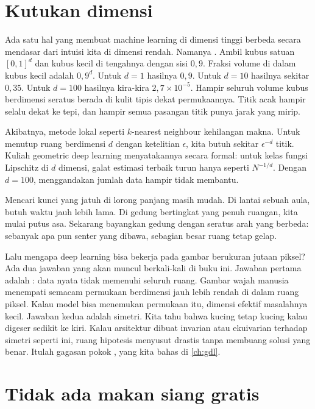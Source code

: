 \section{Kutukan dimensi}

Ada satu hal yang membuat machine learning di dimensi tinggi berbeda secara mendasar dari
intuisi kita di dimensi rendah. Namanya . Ambil kubus satuan
$[0,1]^d$ dan kubus kecil di tengahnya dengan sisi $0{,}9$. Fraksi volume di dalam kubus kecil
adalah $0{,}9^d$. Untuk $d=1$ hasilnya $0{,}9$. Untuk $d=10$ hasilnya sekitar $0{,}35$. Untuk
$d=100$ hasilnya kira-kira $2{,}7\times10^{-5}$. Hampir seluruh volume kubus berdimensi seratus
berada di kulit tipis dekat permukaannya. Titik acak hampir selalu dekat ke tepi, dan hampir
semua pasangan titik punya jarak yang mirip.

Akibatnya, metode lokal seperti $k$-nearest neighbour kehilangan makna. Untuk menutup ruang
berdimensi $d$ dengan ketelitian $\epsilon$, kita butuh sekitar $\epsilon^{-d}$ titik. Kuliah
geometric deep learning menyatakannya secara formal: untuk kelas fungsi Lipschitz di $d$ dimensi,
galat estimasi terbaik turun hanya seperti $N^{-1/d}$. Dengan $d=100$, menggandakan jumlah data
hampir tidak membantu.

Mencari kunci yang jatuh di lorong panjang masih mudah. Di lantai sebuah aula, butuh waktu jauh
lebih lama. Di gedung bertingkat yang penuh ruangan, kita mulai putus asa. Sekarang bayangkan
gedung dengan seratus arah yang berbeda: sebanyak apa pun senter yang dibawa, sebagian besar
ruang tetap gelap.

Lalu mengapa deep learning bisa bekerja pada gambar berukuran jutaan piksel? Ada dua jawaban
yang akan muncul berkali-kali di buku ini. Jawaban pertama adalah :
data nyata tidak memenuhi seluruh ruang. Gambar wajah manusia menempati semacam permukaan
berdimensi jauh lebih rendah di dalam ruang piksel. Kalau model bisa menemukan permukaan itu,
dimensi efektif masalahnya kecil. Jawaban kedua adalah simetri. Kita tahu bahwa kucing tetap
kucing kalau digeser sedikit ke kiri. Kalau arsitektur dibuat invarian atau ekuivarian terhadap
simetri seperti ini, ruang hipotesis menyusut drastis tanpa membuang solusi yang benar. Itulah
gagasan pokok \citet{bronstein2021}, yang kita bahas di \cref{ch:gdl}.

\section{Tidak ada makan siang gratis}

